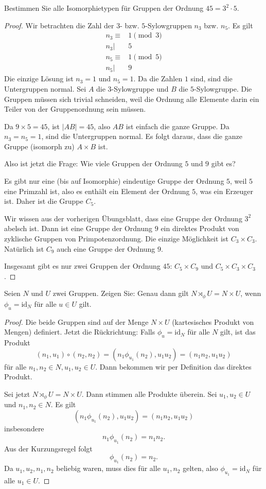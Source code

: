 \begin{Problem}
	Bestimmen Sie alle Isomorphietypen f\"{u}r Gruppen der Ordnung $45=3^2\cdot 5$.
\end{Problem}
\begin{proof}
	Wir betrachten die Zahl der $3$- bzw. $5$-Sylowgruppen $n_3$ bzw. $n_5$. Es gilt
	\begin{align*}
		n_3\equiv& 1\pmod{3}\\
		n_3|& 5\\
		n_5\equiv& 1\pmod{5}\\
		n_5|& 9
	\end{align*}
	Die einzige Lösung ist $n_3=1$ und $n_5=1$. Da die Zahlen $1$ sind, sind die Untergruppen normal. Sei $A$ die $3$-Sylowgruppe und $B$ die $5$-Sylowgruppe. Die Gruppen müssen sich trivial schneiden, weil die Ordnung alle Elemente darin ein Teiler von der Gruppenordnung sein müssen. 

	Da $9\times 5=45$, ist $|AB|=45$, also $AB$ ist einfach die ganze Gruppe. Da $n_3=n_5=1$, sind die Untergruppen normal. Es folgt daraus, dass die ganze Gruppe (isomorph zu) $A\times B$ ist.

	Also ist jetzt die Frage: Wie viele Gruppen der Ordnung $5$ und $9$ gibt es?

	Es gibt nur eine (bis auf Isomorphie) eindeutige Gruppe der Ordnung $5$, weil $5$ eine Primzahl ist, also es enthält ein Element der Ordnung $5$, was ein Erzeuger ist. Daher ist die Gruppe $C_5$.

	Wir wissen aus der vorherigen Übungsblatt, dass eine Gruppe der Ordnung $3^2$ abelsch ist. Dann ist eine Gruppe der Ordnung $9$ ein direktes Produkt von zyklische Gruppen von Primpotenzordnung. Die einzige Möglichkeit ist $C_3\times C_3$. Natürlich ist $C_9$ auch eine Gruppe der Ordnung $9$. 

	Insgesamt gibt es nur zwei Gruppen der Ordnung $45$: $C_5\times C_9$ und $C_5\times C_3\times C_3$.
\end{proof}
\begin{Problem}\label{pr:introalgblatt10-2}
	Seien $N$ und $U$ zwei Gruppen. Zeigen Sie: Genau dann gilt $N\rtimes_{\phi}U=N\times U$, wenn $\phi_u=\text{id}_N$ f\"{u}r alle $u\in U$ gilt.
\end{Problem}
\begin{proof}
	Die beide Gruppen sind auf der Menge $N\times U$ (kartesisches Produkt von Mengen) definiert. Jetzt die Rückrichtung: Falls $\phi_u=\text{id}_N$ f\"{u}r alle $N$ gilt, ist das Produkt
	\[
		(n_1,u_1)\circ (n_2,n_2)=(n_1\phi_{u_1}(n_2),u_1u_2)=(n_1n_2,u_1u_2)
	\]
	f\"{u}r alle $n_1,n_2\in N, u_1,u_2\in U$. Dann bekommen wir per Definition das direktes Produkt.

	Sei jetzt $N\rtimes_{\phi}U=N\times U$. Dann stimmen alle Produkte überein. Sei $u_1,u_2\in U$ und $n_1,n_2\in N$. Es gilt
	\[
		(n_1\phi_{u_1}(n_2),u_1u_2)=(n_1n_2,u_1u_2)
	\]
	insbesondere
	\[
		n_1\phi_{u_1}(n_2)=n_1n_2
	.\] 
	Aus der Kurzungsregel folgt
	\[
		\phi_{u_1}(n_2)=n_2
	.\] 
	Da $u_1,u_2,n_1,n_2$ beliebig waren, muss dies f\"{u}r alle $u_1,n_2$ gelten, also $\phi_{u_1}=\text{id}_N$ f\"{u}r alle $u_1\in U$.
\end{proof}
